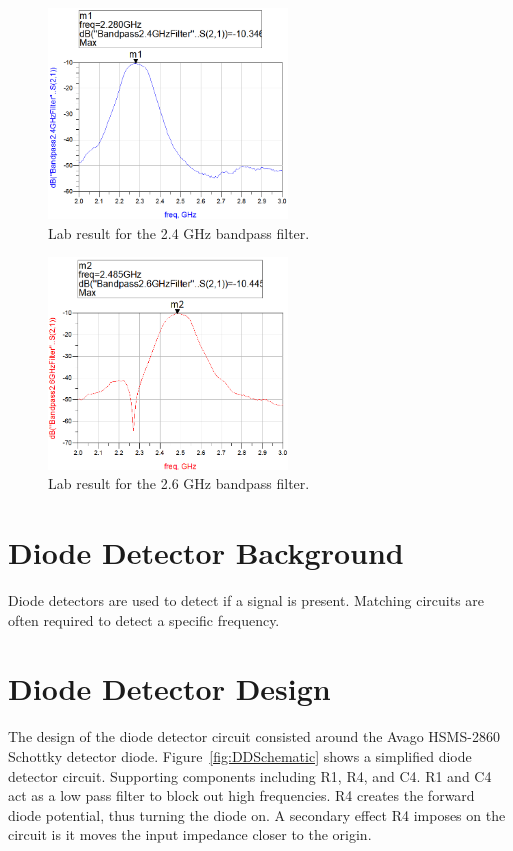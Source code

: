 \documentclass[conference]{IEEEtran}
\begin{document}
\begin{figure}[!htb]
\centering
\includegraphics[width=2.5in]{bandpass-pics/bpf24.png}
\caption{Lab result for the 2.4 GHz bandpass filter.}
\label{fig:bpf24}
\end{figure}

\begin{figure}[!htb]
\centering
\includegraphics[width=2.5in]{bandpass-pics/bpf26.png}
\caption{Lab result for the 2.6 GHz bandpass filter.}
\label{fig:bpf26}
\end{figure}

\section{Diode Detector Background}
Diode detectors are used to detect if a signal is present. Matching circuits are often required to detect a specific frequency.

\section{Diode Detector Design}
The design of the diode detector circuit consisted around the Avago HSMS-2860 Schottky detector diode. Figure~\ref{fig:DDSchematic} shows a simplified diode detector circuit. Supporting components including R1, R4, and C4. R1 and C4 act as a low pass filter to block out high frequencies. R4 creates the forward diode potential, thus turning the diode on. A secondary effect R4 imposes on the circuit is it moves the input impedance closer to the origin.
\end{document}
